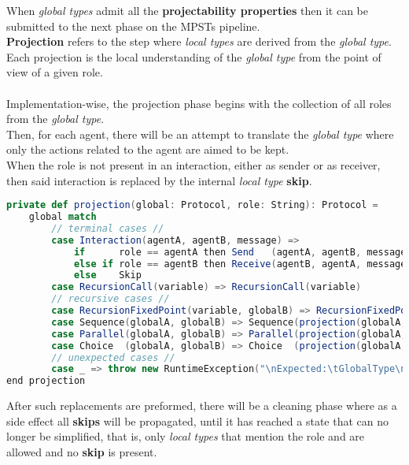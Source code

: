 \normalsize
When \textit{global types} admit all the \textbf{projectability properties} then it can be submitted to the next phase on the MPSTs pipeline.\\
\textbf{Projection} refers to the step where \textit{local types} are derived from the \textit{global type}. Each projection is the local understanding of the \textit{global type} from the point of view of a given role.\\
\\
Implementation-wise, the projection phase begins with the collection of all roles from the \textit{global type}.\\
Then, for each agent, there will be an attempt to translate the \textit{global type} where only the actions related to the agent are aimed to be kept.\\
When the role is not present in an interaction, either as sender or as receiver, then said interaction is replaced by the internal \textit{local type} \textbf{skip}.\\
\begin{lstlisting}[language=Scala, caption=Projection]
private def projection(global: Protocol, role: String): Protocol =
    global match
        // terminal cases //
        case Interaction(agentA, agentB, message) =>
            if      role == agentA then Send   (agentA, agentB, message)
            else if role == agentB then Receive(agentB, agentA, message)
            else    Skip
        case RecursionCall(variable) => RecursionCall(variable)
        // recursive cases //
        case RecursionFixedPoint(variable, globalB) => RecursionFixedPoint(variable, projection(globalB, role))
        case Sequence(globalA, globalB) => Sequence(projection(globalA, role), projection(globalB, role))
        case Parallel(globalA, globalB) => Parallel(projection(globalA, role), projection(globalB, role))
        case Choice  (globalA, globalB) => Choice  (projection(globalA, role), projection(globalB, role))
        // unexpected cases //
        case _ => throw new RuntimeException("\nExpected:\tGlobalType\nFound:\t\tLocalType")
end projection
\end{lstlisting}
After such replacements are preformed, there will be a cleaning phase where as a side effect all \textbf{skips} will be propagated, until it has reached a state that can no longer be simplified, that is, only \textit{local types} that mention the role and are allowed and no \textbf{skip} is present.